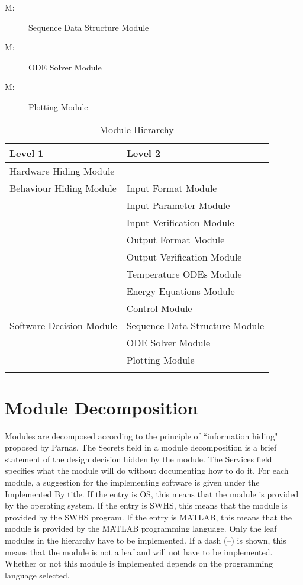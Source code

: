 \documentclass[12pt]{article}
\newcounter{modnum}
\newcommand{\mthemodnum}{M\themodnum}
\begin{document}
\begin{description}
\item[\mthemodnum\label{Mmodseqdesc}:]Sequence Data Structure Module
\end{description}
\begin{description}
\item[\mthemodnum\label{Mmododedesc}:]ODE Solver Module
\end{description}
\begin{description}
\item[\mthemodnum\label{Mmodplotdesc}:]Plotting Module
\end{description}
\begin{longtable}{l l}
\toprule
Level 1 & Level 2
\\
\midrule
Hardware Hiding Module & 
\\
Behaviour Hiding Module & Input Format Module
\\
 & Input Parameter Module
\\
 & Input Verification Module
\\
 & Output Format Module
\\
 & Output Verification Module
\\
 & Temperature ODEs Module
\\
 & Energy Equations Module
\\
 & Control Module
\\
Software Decision Module & Sequence Data Structure Module
\\
 & ODE Solver Module
\\
 & Plotting Module
\\
\bottomrule
\caption{Module Hierarchy}
\label{Table:ModuHier}
\end{longtable}
\section{Module Decomposition}
\label{Sec:ModuDeco}
Modules are decomposed according to the principle of ``information hiding" proposed by Parnas. The Secrets field in a module decomposition is a brief statement of the design decision hidden by the module. The Services field specifies what the module will do without documenting how to do it. For each module, a suggestion for the implementing software is given under the Implemented By title. If the entry is OS, this means that the module is provided by the operating system. If the entry is SWHS, this means that the module is provided by the SWHS program. If the entry is MATLAB, this means that the module is provided by the MATLAB programming language. Only the leaf modules in the hierarchy have to be implemented. If a dash (--) is shown, this means that the module is not a leaf and will not have to be implemented. Whether or not this module is implemented depends on the programming language selected.
\end{document}
